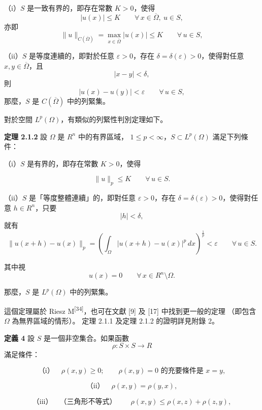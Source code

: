\documentclass[11pt,a4paper,twoside]{article}
\newcommand{\pnum}[1]{%
    \makebox[0pt][r]{%
        \scriptsize\textbf{[#1]}\hspace{0.7em}%
    }%
}
\begin{document}
\noindent
（i）$S$ 是一致有界的，即存在常數 $K>0$，使得
\[
    |u(x)|\le K
    \qquad
    \forall\,x\in\overline{\Omega},\ u\in S,
\]
亦即
\[
    \|u\|_{C(\overline{\Omega})}
    =
    \max_{x\in\overline{\Omega}}|u(x)|
    \le K
    \qquad
    \forall\,u\in S,
\]

\noindent
（ii）$S$ 是等度連續的，即對於任意 $\varepsilon>0$，存在
$\delta=\delta(\varepsilon)>0$，使得對任意
$x,y\in\overline{\Omega}$，且
\[
    |x-y|<\delta,
\]
則
\[
    |u(x)-u(y)|<\varepsilon
    \qquad
    \forall\,u\in S,
\]
那麼，$S$ 是 $C(\overline{\Omega})$ 中的列緊集。

\noindent
\pnum{52}
對於空間 $L^p(\Omega)$，有類似的列緊性判別定理如下。

\noindent
\pnum{53}
\textbf{定理 2.1.2}\quad
設 $\Omega$ 是 $R^n$ 中的有界區域，
$1\le p<\infty$，$S\subset L^p(\Omega)$ 滿足下列條件：

\noindent
（i）$S$ 是有界的，即存在常數 $K>0$，使得

\newpage

\noindent
\pnum{54}
\[
    \|u\|_p\le K
    \qquad
    \forall\,u\in S.
\]

\noindent
（ii）$S$ 是「等度整體連續」的，即對任意 $\varepsilon>0$，存在
$\delta=\delta(\varepsilon)>0$，使得對任意 $h\in R^n$，只要
\[
    |h|<\delta,
\]
就有
\[
    \|u(x+h)-u(x)\|_p
    =
    \left(
    \int_\Omega |u(x+h)-u(x)|^p\,dx
    \right)^{\frac1p}
    <\varepsilon
    \qquad
    \forall\,u\in S.
\]

其中視
\[
    u(x)=0
    \qquad
    \forall\,x\in R^n\setminus\Omega.
\]

那麼，$S$ 是 $L^p(\Omega)$ 中的列緊集。

\noindent
\pnum{55}
這個定理屬於 Riesz M\textsuperscript{[34]}，也可在文獻 [9] 及 [17] 中找到更一般的定理
（即包含 $\Omega$ 為無界區域的情形）。
定理 2.1.1 及定理 2.1.2 的證明詳見附錄 2。

\noindent
\pnum{56}
\textbf{定義 4}\quad
設 $S$ 是一個非空集合。如果函數
\[
    \rho:S\times S\longrightarrow R
\]
滿足條件：

\[
    \text{（i）}\quad
    \rho(x,y)\ge 0;
    \qquad
    \rho(x,y)=0\text{ 的充要條件是 }x=y,
\]

\[
    \text{（ii）}\quad
    \rho(x,y)=\rho(y,x),
\]

\[
    \text{（iii）}\quad
    \text{（三角形不等式）}\qquad
    \rho(x,y)\le \rho(x,z)+\rho(z,y),
\]
\end{document}
